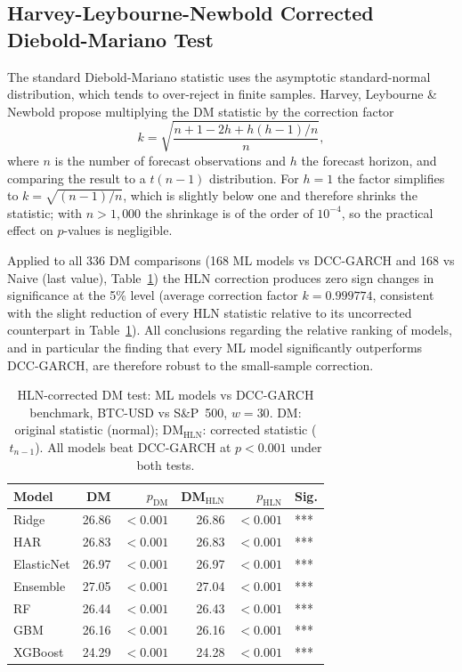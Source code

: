 \subsection{Harvey-Leybourne-Newbold Corrected Diebold-Mariano Test}

The standard Diebold-Mariano statistic uses the asymptotic standard-normal
distribution, which tends to over-reject in finite samples.
Harvey, Leybourne \& Newbold \cite{harvey1997testing} propose multiplying
the DM statistic by the correction factor
\begin{equation}
    k = \sqrt{\frac{n + 1 - 2h + h(h-1)/n}{n}},
\end{equation}
where $n$ is the number of forecast observations and $h$ the forecast horizon,
and comparing the result to a $t(n-1)$ distribution.
For $h = 1$ the factor simplifies to $k = \sqrt{(n-1)/n}$, which is slightly
below one and therefore shrinks the statistic; with $n > 1{,}000$ the shrinkage
is of the order of $10^{-4}$, so the practical effect on $p$-values is
negligible.

Applied to all 336 DM comparisons (168 ML models vs DCC-GARCH and 168 vs
Naive (last value), Table~\ref{tab:dm_hln}) the HLN correction produces zero sign
changes in significance at the 5\% level (average correction factor
$k = 0.999774$, consistent with the slight reduction of every HLN statistic
relative to its uncorrected counterpart in Table~\ref{tab:dm_hln}).
All conclusions regarding the relative ranking of models, and in particular
the finding that every ML model significantly outperforms DCC-GARCH, are
therefore robust to the small-sample correction.

\begin{table}[H]
    \centering
    \caption{HLN-corrected DM test: ML models vs DCC-GARCH benchmark,
             BTC-USD vs S\&P~500, $w = 30$.
             DM: original statistic (normal); DM$_\text{HLN}$: corrected
             statistic ($t_{n-1}$).
             All models beat DCC-GARCH at $p < 0.001$ under both tests.}
    \label{tab:dm_hln}
    \begin{tabular}{lrrrrl}
        \toprule
        Model & DM & $p_\text{DM}$ & DM$_\text{HLN}$ & $p_\text{HLN}$ & Sig. \\
        \midrule
        Ridge      & 26.86 & $<0.001$ & 26.86 & $<0.001$ & *** \\
        HAR        & 26.83 & $<0.001$ & 26.83 & $<0.001$ & *** \\
        ElasticNet & 26.97 & $<0.001$ & 26.97 & $<0.001$ & *** \\
        Ensemble   & 27.05 & $<0.001$ & 27.04 & $<0.001$ & *** \\
        RF         & 26.44 & $<0.001$ & 26.43 & $<0.001$ & *** \\
        GBM        & 26.16 & $<0.001$ & 26.16 & $<0.001$ & *** \\
        XGBoost   & 24.29 & $<0.001$ & 24.28 & $<0.001$ & *** \\
        \bottomrule
    \end{tabular}
\end{table}

